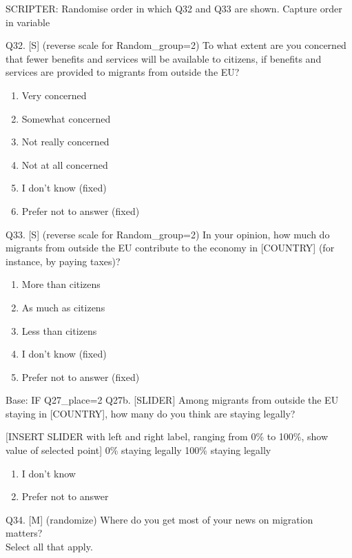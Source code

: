 \documentclass[
  12pt,
  a4paper,
]{article}
\providecommand{\tightlist}{%
  \setlength{\itemsep}{0pt}\setlength{\parskip}{0pt}}
\begin{document}
SCRIPTER: Randomise order in which Q32 and Q33 are shown. Capture order in variable

Q32. {[}S{]} (reverse scale for Random\_group=2) To what extent are you concerned that fewer benefits and services will be available to citizens, if benefits and services are provided to migrants from outside the EU?

\begin{enumerate}
\def\labelenumi{\arabic{enumi}.}
\tightlist
\item
  Very concerned
\item
  Somewhat concerned
\item
  Not really concerned
\item
  Not at all concerned
\item
  I don't know (fixed)
\item
  Prefer not to answer (fixed)
\end{enumerate}

Q33. {[}S{]} (reverse scale for Random\_group=2) In your opinion, how much do migrants from outside the EU contribute to the economy in {[}COUNTRY{]} (for instance, by paying taxes)?

\begin{enumerate}
\def\labelenumi{\arabic{enumi}.}
\tightlist
\item
  More than citizens
\item
  As much as citizens\\
\item
  Less than citizens\\
\item
  I don't know (fixed)
\item
  Prefer not to answer (fixed)
\end{enumerate}

Base: IF Q27\_place=2
Q27b. {[}SLIDER{]} Among migrants from outside the EU staying in {[}COUNTRY{]}, how many do you think are staying legally?

{[}INSERT SLIDER with left and right label, ranging from 0\% to 100\%, show value of selected point{]}
0\% staying legally 100\% staying legally

\begin{enumerate}
\def\labelenumi{\arabic{enumi}.}
\setcounter{enumi}{97}
\tightlist
\item
  I don't know
\item
  Prefer not to answer
\end{enumerate}

Q34. {[}M{]} (randomize) Where do you get most of your news on migration matters?\\
Select all that apply.
\end{document}
